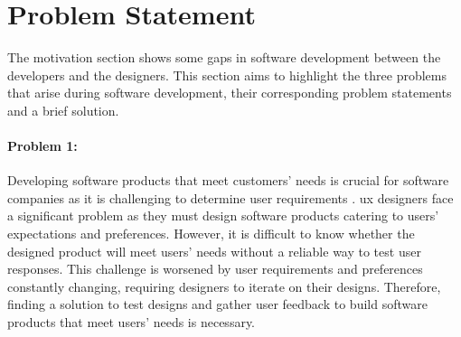 \section{Problem Statement} %
\label{introduction:section:problems}
The motivation section shows some gaps in software development between the developers and the designers.
This section aims to highlight the three problems that arise during software development, their corresponding problem statements and a brief solution.

\paragraph{Problem 1:} 
Developing software products that meet customers' needs is crucial for software companies as it is challenging to determine user requirements \cite{article:experiments:lindgren}. 
\ac{ux} designers face a significant problem as they must design software products catering to users' expectations and preferences. 
However, it is difficult to know whether the designed product will meet users' needs without a reliable way to test user responses. 
This challenge is worsened by user requirements and preferences constantly changing, requiring designers to iterate on their designs. 
Therefore, finding a solution to test designs and gather user feedback to build software products that meet users' needs is necessary.




